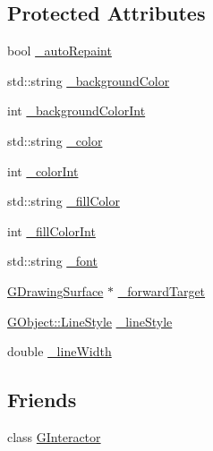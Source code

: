 \subsection*{Protected Attributes}
\begin{DoxyCompactItemize}
\item 
bool \mbox{\hyperlink{classGDrawingSurface_a738dd6afc69ac536ad46cf4d89a90933}{\+\_\+auto\+Repaint}}
\item 
std\+::string \mbox{\hyperlink{classGDrawingSurface_ad233544ea51cf6b435a199f3e3790607}{\+\_\+background\+Color}}
\item 
int \mbox{\hyperlink{classGDrawingSurface_abb8452ab4f23ecf455b9e021bf09ef91}{\+\_\+background\+Color\+Int}}
\item 
std\+::string \mbox{\hyperlink{classGDrawingSurface_a1134e770ae4315ea8bc1201e2f21da8b}{\+\_\+color}}
\item 
int \mbox{\hyperlink{classGDrawingSurface_a003fdd343d9b7505c53a8b7a134200ed}{\+\_\+color\+Int}}
\item 
std\+::string \mbox{\hyperlink{classGDrawingSurface_a179f8d6cee65cd8a54692e32b224392a}{\+\_\+fill\+Color}}
\item 
int \mbox{\hyperlink{classGDrawingSurface_a751def333a67d651e5b99cc331ecb496}{\+\_\+fill\+Color\+Int}}
\item 
std\+::string \mbox{\hyperlink{classGDrawingSurface_aea76ea1a8b5dd7b0a78653277e63b536}{\+\_\+font}}
\item 
\mbox{\hyperlink{classGDrawingSurface}{G\+Drawing\+Surface}} $\ast$ \mbox{\hyperlink{classGDrawingSurface_acbb02fa2a4a51a450fd1cc64dfc39ddd}{\+\_\+forward\+Target}}
\item 
\mbox{\hyperlink{classGObject_a86e0f5648542856159bb40775c854aa7}{G\+Object\+::\+Line\+Style}} \mbox{\hyperlink{classGDrawingSurface_ae15d02c66691247a6824dc5943a620e2}{\+\_\+line\+Style}}
\item 
double \mbox{\hyperlink{classGDrawingSurface_a16e9033665937f13de2e163dc2184aff}{\+\_\+line\+Width}}
\end{DoxyCompactItemize}
\subsection*{Friends}
\begin{DoxyCompactItemize}
\item 
class \mbox{\hyperlink{classGWindow_a054e99eaa992da5c1a77c8d7b3817788}{G\+Interactor}}
\end{DoxyCompactItemize}


